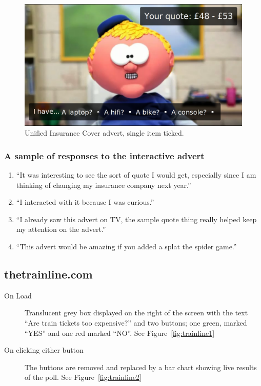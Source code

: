 	\begin{figure}[th]
		\centering
		\includegraphics[width=\textwidth,height=0.5\textheight,keepaspectratio]{images/adverts/unified_insurance_cover-7.png}
		\caption{Unified Insurance Cover advert, single item ticked.}
		\label{fig:Paddy7}
	\end{figure}
	
	\subsubsection*{A sample of responses to the interactive advert}
	\begin{enumerate}
		\item{``It was interesting to see the sort of quote I would get, especially since I am thinking of changing my insurance company next year.''}
		\item{``I interacted with it because I was curious.''}
		\item{``I already saw this advert on TV, the sample quote thing really helped keep my attention on the advert.''}
		\item{``This advert would be amazing if you added a splat the spider game.''}
	\end{enumerate}

\clearpage
\subsection{thetrainline.com}
	\begin{description}
		\item[On Load]{Translucent grey box displayed on the right of the screen with the text ``Are train tickets too expensive?'' and two buttons; one green, marked ``YES'' and one red marked ``NO''. See Figure~\ref{fig:trainline1}}
		\item[On clicking either button]{The buttons are removed and replaced by a bar chart showing live results of the poll. See Figure~\ref{fig:trainline2}}
	\end{description}

